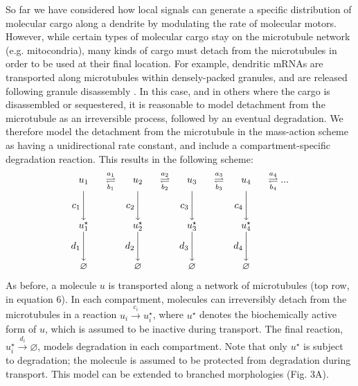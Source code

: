 \documentclass[11pt]{wlpeerj}
\begin{document}
So far we have considered how local signals can generate a specific distribution of molecular cargo along a dendrite by modulating the rate of molecular motors. However,
while certain types of molecular cargo stay on the microtubule network (e.g. mitocondria), many kinds of cargo must detach from the microtubules in order to be used at their final location.
For example, dendritic mRNAs are transported along microtubules within densely-packed granules, and are released following granule disassembly \citep{Krichevsky_2001,Buxbaum_2014a}.
In this case, and in others where the cargo is disassembled or sequestered, it is reasonable to model detachment from the microtubule as an irreversible process, followed by an eventual degradation.
We therefore model the detachment from the microtubule in the mass-action scheme as having a unidirectional rate constant, and include a compartment-specific degradation reaction. This results in the following scheme:
\begin{equation}
\begin{array}{cccccccc}
u_1 & \overset{a_1}{\underset{b_1}{\rightleftharpoons}} &
u_2 & \overset{a_2}{\underset{b_2}{\rightleftharpoons}} &
u_3 & \overset{a_3}{\underset{b_3}{\rightleftharpoons}} &
u_4 & \overset{a_4}{\underset{b_4}{\rightleftharpoons}} ...
\\
c_1 \Bigg\downarrow \phantom{c_1} & &
c_2 \Bigg\downarrow \phantom{c_2} & &
c_3 \Bigg\downarrow \phantom{c_3} & &
c_4 \Bigg\downarrow \phantom{c_4} & 
\\
u_1^\star &  &
u_2^\star &  &
u_3^\star &  &
u_4^\star &   
\\
d_1 \Bigg\downarrow \phantom{d_1} & &
d_2 \Bigg\downarrow \phantom{d_2} & &
d_3 \Bigg\downarrow \phantom{d_3} & &
d_4 \Bigg\downarrow \phantom{d_4} & 
\\
\varnothing &  &
\varnothing &  &
\varnothing &  &
\varnothing &  
\end{array}
\end{equation}
As before, a molecule $u$ is transported along a network of microtubules (top row, in equation 6).
In each compartment, molecules can irreversibly detach from the microtubules in a reaction $u_i \xrightarrow{c_i} u_i^\star$, where $u^\star$ denotes the biochemically active form of $u$, which is assumed to be inactive during transport.
The final reaction, $u_i^\star \xrightarrow{d_i} \varnothing$, models degradation in each compartment.
Note that only $u^\star$ is subject to degradation; the molecule is assumed to be protected from degradation during transport.
This model can be extended to branched morphologies (Fig. 3A).
\end{document}
